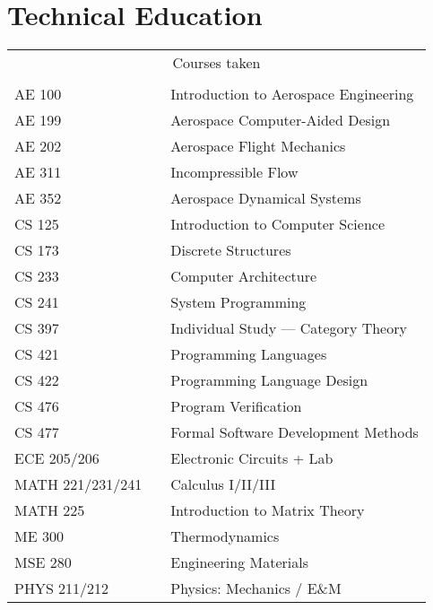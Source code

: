 \documentclass[10pt,letterpaper,sans]{moderncv}
\begin{document}
\section{Technical Education}
\vspace{1em}
\begin{tabular}{l p{1in} l}
  \multicolumn{3}{c}{Courses taken} \\
  \\[3pt]
  AE 100           & \hfill & Introduction to Aerospace Engineering \\
  AE 199           & \hfill & Aerospace Computer-Aided Design       \\
  AE 202           & \hfill & Aerospace Flight Mechanics            \\
  AE 311           & \hfill & Incompressible Flow                   \\
  AE 352           & \hfill & Aerospace Dynamical Systems           \\
  CS 125           & \hfill & Introduction to Computer Science      \\
  CS 173           & \hfill & Discrete Structures                   \\
  CS 233           & \hfill & Computer Architecture                 \\
  CS 241           & \hfill & System Programming                    \\
  CS 397           & \hfill & Individual Study --- Category Theory  \\
  CS 421           & \hfill & Programming Languages                 \\
  CS 422           & \hfill & Programming Language Design           \\
  CS 476           & \hfill & Program Verification                  \\
  CS 477           & \hfill & Formal Software Development Methods   \\
  ECE 205/206      & \hfill & Electronic Circuits + Lab             \\
  MATH 221/231/241 & \hfill & Calculus I/II/III                     \\
  MATH 225         & \hfill & Introduction to Matrix Theory         \\
  ME 300           & \hfill & Thermodynamics                        \\
  MSE 280          & \hfill & Engineering Materials                 \\
  PHYS 211/212     & \hfill & Physics: Mechanics / E\&M             \\

\end{tabular}
\end{document}
